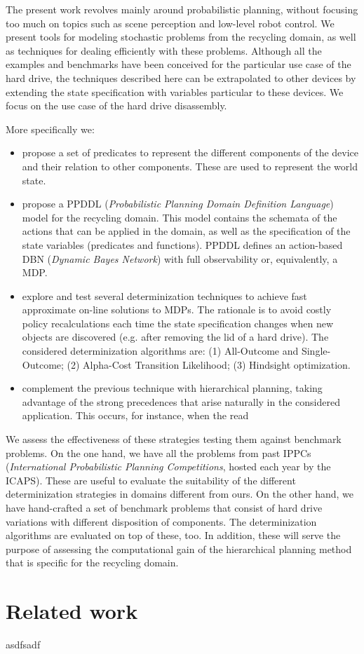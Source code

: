 \documentclass[../root.tex]{subfiles}
\begin{document}
The present work revolves mainly around probabilistic planning, without focusing too much
on topics such as scene perception and low-level robot control.
We present tools for modeling stochastic problems from the recycling
domain, as well as techniques for
dealing efficiently with these problems. Although all the examples and benchmarks
have been conceived for the particular use case of the hard drive,
the techniques described here can be extrapolated to other devices by extending
the state specification with variables particular to these devices.
We focus on the use case of the
hard drive disassembly.

More specifically we:
\begin{itemize}
	\item propose a set of predicates to represent the different components of
	the device and their relation to other components. These are used to represent
	the world state.
	\item propose a PPDDL (\emph{Probabilistic Planning Domain Definition Language})
	model for the recycling domain. This model contains the schemata of the actions
	that can be applied in the domain, as well as the specification of the
	state variables (predicates and functions). PPDDL defines an action-based
	DBN (\emph{Dynamic Bayes Network}) with full observability or, equivalently,
	a MDP.
	\item explore and test several determinization techniques to achieve fast
	approximate on-line solutions to MDPs. The rationale is to avoid costly policy
	recalculations each time the state specification changes when new objects
	are discovered (e.g. after removing the lid of a hard drive). The considered
	determinization algorithms are: (1) All-Outcome and Single-Outcome;
	(2) Alpha-Cost Transition Likelihood; (3) Hindsight optimization.
	\item complement the previous technique with hierarchical planning, taking
	advantage of the strong precedences that arise naturally in the
	considered application. This occurs, for instance, when the read
\end{itemize}

We assess the effectiveness of these strategies testing them against
benchmark problems. On the one hand, we have all the problems from past
IPPCs
(\emph{International Probabilistic Planning Competitions}, hosted
each year by the ICAPS). These are useful to evaluate the suitability of
the different
determinization strategies in domains different from ours. On the other hand,
we have hand-crafted a set of benchmark problems that consist of
hard drive variations with different disposition of components. The determinization
algorithms are evaluated on top of these, too. In addition, these will serve
the purpose of assessing the computational gain of the hierarchical planning
method that is specific for the recycling domain.

\section{Related work}

asdfsadf

\end{document}
